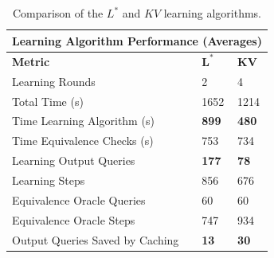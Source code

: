 \begin{table}[h]
	\centering
	\begin{tabular}{ |p{6.5cm}||p{1cm}|p{1cm}|  }
		\hline
		\multicolumn{3}{|c|}{\textbf{Learning Algorithm Performance (Averages)}} \\
		\hline
		\textbf{Metric} & $\mathbf{L^*}$ & $\mathbf{KV}$ \\
		\hline
		Learning Rounds							&	2				&	4 				\\
		Total Time (s)							&   1652			& 	1214   			\\
		Time Learning Algorithm	(s)				&	\textbf{899}	& 	\textbf{480}	\\
		Time Equivalence Checks (s)				& 	753				& 	734			\\
		Learning Output Queries 				&   \textbf{177}	& 	\textbf{78}		\\
		Learning Steps							& 	856	  			& 	676   			\\
		Equivalence Oracle Queries				& 	60  			&  	60				\\
		Equivalence Oracle Steps				& 	747  			&  	934				\\
		Output Queries Saved by Caching			& 	\textbf{13}		&  	\textbf{30}				\\
		\hline
	\end{tabular}
	\caption{Comparison of the $L^*$ and $KV$ learning algorithms.}
	\label{tab:compkvlstar}
\end{table}
\newpage

